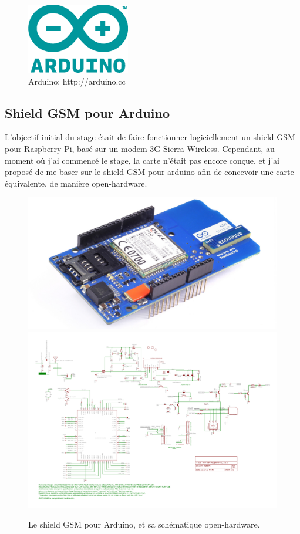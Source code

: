 \documentclass{article}
\begin{document}
\begin{figure}[h!]
    \centering\includegraphics{img/logo.png}
    \caption{Arduino: http://arduino.cc}
\end{figure}

\clearpage

\subsection{Shield GSM pour Arduino}
\label{gsm}

L’objectif initial du stage était de faire fonctionner logiciellement un shield GSM pour Raspberry Pi, basé sur un modem 3G Sierra Wireless. Cependant, au moment où j’ai commencé le stage, la carte n’était pas encore conçue, et j’ai proposé de me baser sur le shield GSM pour arduino afin de concevoir une carte équivalente, de manière open-hardware.

\begin{figure}[h!]
    \centering\includegraphics[width=\linewidth*2/3]{img/shield_gsm.jpg}
    \centering\includegraphics[width=\linewidth]{img/arduino-gsm-shield-schematic.pdf}
    \caption{Le shield GSM pour Arduino, et sa schématique open-hardware.}
\end{figure}
\end{document}
